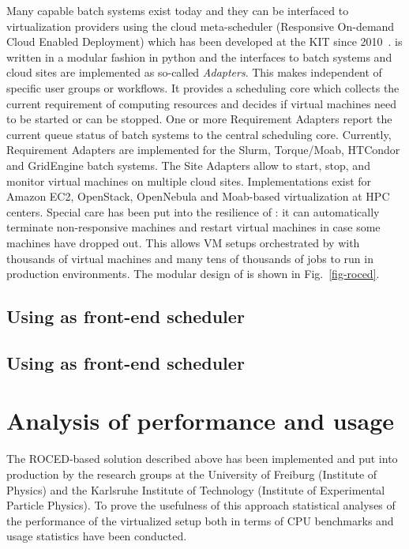 Many capable batch systems exist today and they can be interfaced to virtualization providers using the cloud meta-scheduler \Roced (Responsive On-demand Cloud Enabled Deployment) which has been developed at the KIT since 2010~\cite{ROCED}. \Roced is written in a modular
fashion in python and the interfaces to batch systems and cloud sites
are implemented as so-called \textit{Adapters}. This makes \Roced
independent of specific user groups or workflows. It provides a
scheduling core which collects the current requirement of computing
resources and decides if virtual machines need to be started or can be
stopped. One or more Requirement Adapters report the current queue
status of batch systems to the central scheduling core. Currently,
Requirement Adapters are implemented for the Slurm, Torque/Moab, HTCondor
and GridEngine batch systems. The Site Adapters allow \Roced to start,
stop, and monitor virtual machines on multiple cloud
sites. Implementations exist for Amazon EC2, OpenStack, OpenNebula and
Moab-based virtualization at HPC centers. Special care has been put
into the resilience of \Roced: it can automatically terminate
non-responsive machines and restart virtual machines in case some
machines have dropped out. This allows VM setups orchestrated by \Roced with thousands of virtual machines and many tens of thousands of jobs to run in production environments.
The modular design of \Roced is shown in Fig.~\ref{fig-roced}.

\subsection{Using \HTCondor as front-end scheduler}\label{sec:ROCED:HTCondor}


\subsection{Using \Slurm as front-end scheduler}



\section{Analysis of performance and usage}

The ROCED-based solution described above has been implemented and put into production by the research groups at the University of Freiburg (Institute of Physics) and the Karlsruhe Institute of Technology (Institute of Experimental
Particle Physics). To prove the usefulness of this approach
statistical analyses of the performance of the virtualized setup both
in terms of CPU benchmarks and usage statistics have been conducted.

